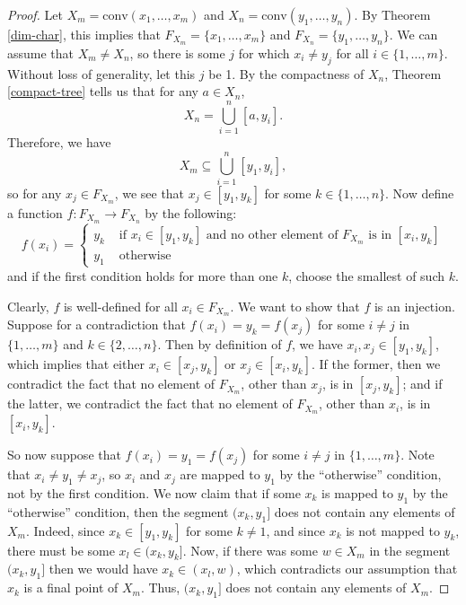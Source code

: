 \documentclass{bcp92}
\theoremstyle{plain}
\theoremstyle{definition}
\begin{document}
\begin{proof}
Let $X_m = \text{conv}(x_1, \dots, x_{m})$ and $X_n = \text{conv}(y_1, \dots,
y_{n})$. By Theorem \ref{dim-char}, this implies that $F_{X_m} = \{ x_1,
\dots, x_{m} \}$ and $F_{X_n} = \{ y_1, \dots, y_{n} \}$. We can assume that
$X_m \neq X_n$, so there is some $j$ for which $x_i \neq y_j$ for all $i \in
\{ 1, \dots, m \}$. Without loss of generality, let this $j$ be 1. By the
compactness of $X_n$, Theorem \ref{compact-tree} tells us that for any $a \in
X_n$,
$$
X_n = \bigcup_{i=1}^{n}{[a,y_i]}.
$$
Therefore, we have
$$
X_m \subseteq \bigcup_{i=1}^{n}{[y_1,y_i]} ,
$$
so for any $x_j \in F_{X_m}$, we see that $x_j \in [y_1,y_k]$ for some $k \in
\{ 1, \dots, n \}$. Now define a function $f: F_{X_m} \rightarrow F_{X_n}$ by
the following:
$$
f(x_i) = \begin{cases}
y_k & \text{ if } x_i \in [y_1,y_k] \text{ and no other element of } F_{X_m}
\text{ is in } [x_i,y_k] \\
y_1 & \text{ otherwise}
\end{cases}
$$
and if the first condition holds for more than one $k$, choose the smallest
of such $k$.

Clearly, $f$ is well-defined for all $x_i \in F_{X_m}$. We want to show that
$f$ is an injection. Suppose for a contradiction that $f(x_i) = y_k = f(x_j)$
for some $i \neq j$ in $\{ 1, \dots, m \}$ and $k \in \{ 2, \dots, n \}$.
Then by definition of $f$, we have $x_i,x_j \in [y_1,y_k]$, which implies
that either $x_i \in [x_j,y_k]$ or $x_j \in [x_i,y_k]$. If the former, then
we contradict the fact that no element of $F_{X_m}$, other than $x_j$, is in
$[x_j,y_k]$; and if the latter, we contradict the fact that no element of
$F_{X_m}$, other than $x_i$, is in $[x_i,y_k]$.

So now suppose that $f(x_i) = y_1 = f(x_j)$ for some $i \neq j$ in $\{ 1,
\dots, m \}$. Note that $x_i \neq y_1 \neq x_j$, so $x_i$ and $x_j$ are
mapped to $y_1$ by the ``otherwise'' condition, not by the first condition.
We now claim that if some $x_k$ is mapped to $y_1$ by the ``otherwise''
condition, then the segment $(x_k,y_1]$ does not contain any elements of
$X_m$. Indeed, since $x_k \in [y_1,y_k]$ for some $k \neq 1$, and since $x_k$
is not mapped to $y_k$, there must be some $x_l \in (x_k,y_k]$. Now, if there
was some $w \in X_m$ in the segment $(x_k,y_1]$ then we would have $x_k \in
(x_l,w)$, which contradicts our assumption that $x_k$ is a final point of
$X_m$. Thus, $(x_k,y_1]$ does not contain any elements of $X_m$.


\end{proof}
\end{document}
